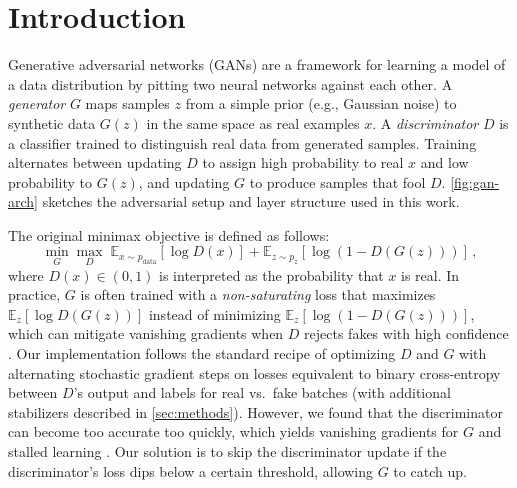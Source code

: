 \documentclass{article}
\theoremstyle{plain}
\theoremstyle{definition}
\theoremstyle{remark}
\begin{document}
\begin{abstract}
This work trains DCGAN-style generative adversarial networks on MNIST and Oxford Flowers~102, progressing from a compact architecture for $28\times 28$ digits to a deeper convolutional generator and discriminator for $64\times 64$ RGB flower images. The resulting flower generator is deployed in \underline{\href{https://neuralnector.com}{NeuralNector}}, an interactive game in which human players act as the discriminator on grids of real versus synthetic images. Training is discussed in light of practical difficulties including discriminator dominance, vanishing gradients, and mode collapse, together with stabilizing modifications to the optimization procedure.
\end{abstract}

\section{Introduction}

Generative adversarial networks (GANs) \cite{GANs} are a framework for learning a model of a data distribution by pitting two neural networks against each other.
A \emph{generator} $G$ maps samples $z$ from a simple prior (e.g., Gaussian noise) to synthetic data $G(z)$ in the same space as real examples $x$.
A \emph{discriminator} $D$ is a classifier trained to distinguish real data from generated samples.
Training alternates between updating $D$ to assign high probability to real $x$ and low probability to $G(z)$, and updating $G$ to produce samples that fool $D$.
\cref{fig:gan-arch} sketches the adversarial setup and layer structure used in this work.

The original minimax objective \cite{GANs} is defined as follows:
\begin{equation}
\label{eq:gan-minimax}
\min_G \max_D \;
\mathbb{E}_{x \sim p_{\mathrm{data}}}[\log D(x)]
+ \mathbb{E}_{z \sim p_z}[\log (1 - D(G(z)))]\,,
\end{equation}
where $D(x) \in (0,1)$ is interpreted as the probability that $x$ is real.
In practice, $G$ is often trained with a \emph{non-saturating} loss that maximizes $\mathbb{E}_z[\log D(G(z))]$ instead of minimizing $\mathbb{E}_z[\log(1-D(G(z)))]$, which can mitigate vanishing gradients when $D$ rejects fakes with high confidence \cite{GANs}.
Our implementation follows the standard recipe of optimizing $D$ and $G$ with alternating stochastic gradient steps on losses equivalent to binary cross-entropy between $D$'s output and labels for real vs.\ fake batches (with additional stabilizers described in \cref{sec:methods}). However, we found that the discriminator can become too accurate too quickly, which yields vanishing gradients for $G$ and stalled learning \cite{TrainingGANs,ImprovedGANs}. Our solution is to skip the discriminator update if the discriminator's loss dips below a certain threshold, allowing $G$ to catch up.
\end{document}
